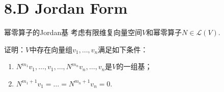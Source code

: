 \section{8.D Jordan Form}

\begin{theorem}[8.55]\label{thm 8.55} 幂零算子的Jordan基 \:
    考虑有限维复向量空间\(V\)和幂零算子\(N \in \mathcal{L}(V)\).

    证明：\(V\)中存在向量组\(v_1, \dots, v_n\)满足如下条件：
    \begin{enumerate}
        \item \(N^{m_1}v_1, \dots, v_1, \dots, N^{m_n}v_n, \dots, v_n\)是\(V\)的一组基；
        \item \(N^{m_1+1}v_1=\dots=N^{m_n+1}v_n=0\).
    \end{enumerate}
\end{theorem}

